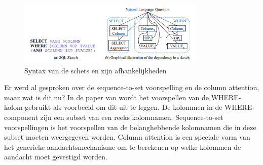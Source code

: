 \begin{figure}[ht]
	\centering
	\includegraphics[width=0.80\textwidth]{img/sqlnetmodel}
	\caption[SQLNet Model]{Syntax van de schets en zijn afhankelijkheden}
	\label{fig:sqlnet}
\end{figure}

Er werd al gesproken over de sequence-to-set voorspelling en de column attention, maar wat is dit nu? In de paper van \textcite{sqlnetPaper} wordt het voorspellen van de WHERE-kolom gebruikt als voorbeeld om dit uit te leggen. De kolommen in de WHERE-component zijn een subset van een reeks kolomnamen. Sequence-to-set voorspellingen is het voorspellen van de belanghebbende kolomnamen die in deze subset moeten weergegeven worden. Column attention is een speciale vorm van het generieke aandachtsmechanisme om te berekenen op welke kolommen de aandacht moet gevestigd worden. 

